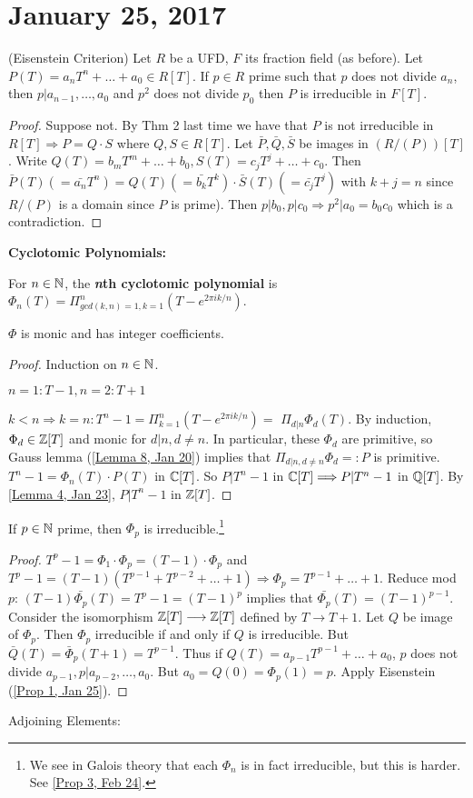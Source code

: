 \section{January 25, 2017}

\begin{prop} \label{Prop 1, Jan 25}
(Eisenstein Criterion) Let $R$ be a UFD, $F$ its fraction field (as before). Let $P(T)=a_nT^n+\ldots+a_0\in R[T]$. If $p\in R$ prime such that $p$ does not divide $a_n$, then $p|a_{n-1},\ldots,a_0$ and $p^2$ does not divide $p_0$ then $P$ is irreducible in $F[T]$.
\end{prop}
\begin{proof}
Suppose not. By Thm 2 last time we have that $P$ is not irreducible in $R[T]\Longrightarrow P=Q\cdot S$ where $Q,S\in R[T].$ Let $\bar{P},\bar{Q},\bar{S}$ be images in $(R/(P))[T]$. Write $Q(T)=b_mT^m+\ldots+b_0, S(T)=c_jT^j+\ldots+c_0$. Then $\bar{P}(T)(=\bar{a_n}T^n)=Q(T)(=\bar{b_k}T^k)\cdot \bar{S}(T)(=\bar{c_j}T^j)$ with $k+j=n$ since $R/(P)$ is a domain since $P$ is prime). Then $p|b_0,p|c_0\Longrightarrow p^2|a_0=b_0c_0$ which is a contradiction.
\end{proof}
\noindent \textbf{Cyclotomic Polynomials:}
\begin{defn} \label{Defn 2, Jan 25}
For $n\in \mathbb{N}$, the \textbf{\textit{n}th cyclotomic polynomial} is $\Phi_n(T)=\Pi_{gcd(k,n)=1,k=1}^n(T-e^{2\pi ik/n})$.
\end{defn}
\begin{prop} \label{Prop 3, Jan 25}
$\Phi$ is monic and has integer coefficients.
\end{prop}
\begin{proof}
Induction on $n\in \mathbb{N}$.

$n=1: T-1,n=2: T+1$

$k<n\Longrightarrow k=n:T^n-1=\Pi_{k=1}^n(T-e^{2\pi ik/n})=$
$\Pi_{d|n}\Phi_d(T)$. By induction, $\Phi_d\in \mathbb{Z}[T]$ and monic for $d|n, d\ne n$. In particular, these $\Phi_d$ are primitive, so Gauss lemma (\ref{Lemma 8, Jan 20}) implies that $\Pi_{d|n,d\ne n}\Phi_d=:P$ is primitive. $T^n-1=\Phi_n(T)\cdot P(T)$ in $\mathbb{C}[T]$. So $P|T^n-1$ in $\mathbb{C}[T]\Longrightarrow P|T^n-1$ in $\mathbb{Q}[T]$. By \ref{Lemma 4, Jan 23}, $P|T^n-1$ in $\mathbb{Z}[T]$.
\end{proof}
\begin{prop} \label{Prop 4, Jan 25}
If $p\in \mathbb{N}$ prime, then $\Phi_p$ is irreducible.\footnote{We see in Galois theory that each $\Phi_n$ is in fact irreducible, but this is harder. See \ref{Prop 3, Feb 24}.}
\end{prop}
\begin{proof}
$T^p-1=\Phi_1\cdot \Phi_p=(T-1)\cdot\Phi_p$ and $T^p-1=(T-1)(T^{p-1}+T^{p-2}+\ldots+1)\Longrightarrow \Phi_p=T^{p-1}+\ldots+1.$ Reduce mod $p$: $(T-1)\bar{\Phi_p}(T)=T^p-1=(T-1)^p$ implies that $\bar{\Phi_p}(T)=(T-1)^{p-1}$. Consider the isomorphism $\mathbb{Z}[T]\longrightarrow \mathbb{Z}[T]$ defined by $T\longrightarrow T+1$. Let $Q$ be image of $\Phi_p$. Then $\Phi_p$ irreducible if and only if $Q$ is irreducible. But $\bar{Q}(T)=\bar{\Phi}_p(T+1)=T^{p-1}$. Thus if $Q(T)=a_{p-1}T^{p-1}+\ldots+a_0$, $p$ does not divide $a_{p-1},p|a_{p-2},\ldots,a_0$. But $a_0=Q(0)=\Phi_p(1)=p$. Apply Eisenstein (\ref{Prop 1, Jan 25}).
\end{proof}
Adjoining Elements:

